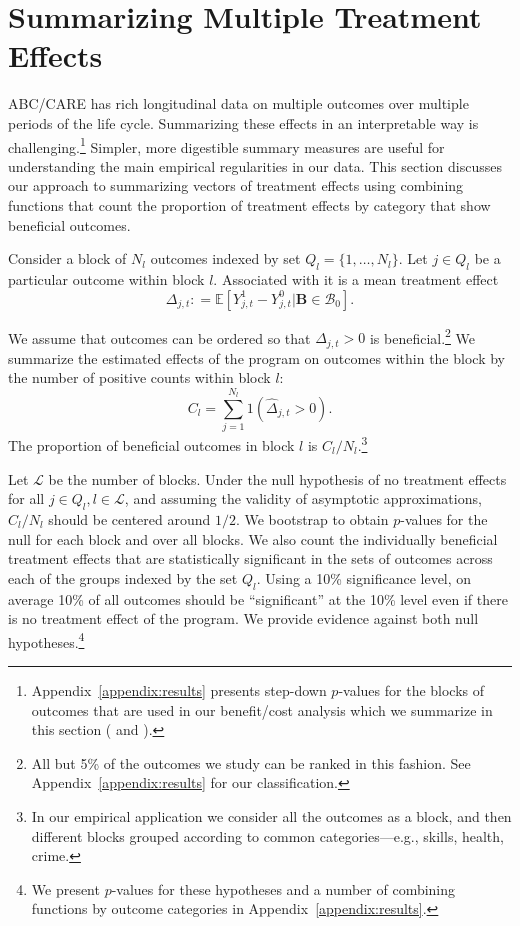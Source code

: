 \section{Summarizing Multiple Treatment Effects} \label{section:methodology}

ABC/CARE has rich longitudinal data on multiple outcomes over multiple periods of the life cycle. Summarizing these effects in an interpretable way is challenging.\footnote{Appendix~\ref{appendix:results} presents step-down $p$-values for the blocks of outcomes that are used in our benefit/cost analysis which we summarize in this section (\citealp{Lehman_Romano_2005_AnnStat} and \citealp{Romano_Shaikh_2006_AnnStat}).} Simpler, more digestible summary measures are useful for understanding the main empirical regularities in our data. This section discusses our approach to summarizing vectors of treatment effects using combining functions that count the proportion of treatment effects by category that show beneficial outcomes.

Consider a block of $N_l$ outcomes indexed by set $Q_l = \{1,\dots,N_l\}$. Let $j \in Q_l$ be a particular outcome within block $l$. Associated with it is a mean treatment effect
\begin{equation}
\Delta_{j,t} : = \mathbb{E} \left[ Y^1_{j,t} - Y^0_{j,t} | \bm{B} \in \mathcal{B}_0 \right].
\end{equation}

We assume that outcomes can be ordered so that $\Delta_{j,t} >0$ is beneficial.\footnote{All but 5\% of the outcomes we study can be ranked in this fashion. See Appendix~\ref{appendix:results} for our classification.} We summarize the estimated effects of the program on outcomes within the block by the number of positive counts within block $l$:
\begin{equation}
C_l = \sum^{N_l}_{j=1} 1 (\hat{\Delta}_{j,t} >0).
\end{equation}
The proportion of beneficial outcomes in block $l$ is $C_l / N_l$.\footnote{In our empirical application we consider all the outcomes as a block, and then different blocks grouped according to common categories---e.g., skills, health, crime.}

Let $\mathcal{L}$ be the number of blocks. Under the null hypothesis of no treatment effects for all $j \in Q_l, l \in \mathcal{L}$, and assuming the validity of asymptotic approximations, $C_l / N_l$ should be centered around $1/2$. We bootstrap to obtain $p$-values for the null for each block and over all blocks. We also count the individually beneficial treatment effects that are statistically significant in the sets of outcomes across each of the groups indexed by the set $Q_l$. Using a 10\% significance level, on average 10\% of all outcomes should be ``significant'' at the 10\% level even if there is no treatment effect of the program. We provide evidence against both null hypotheses.\footnote{We present $p$-values for these hypotheses and a number of combining functions by outcome categories in Appendix~\ref{appendix:results}.}

